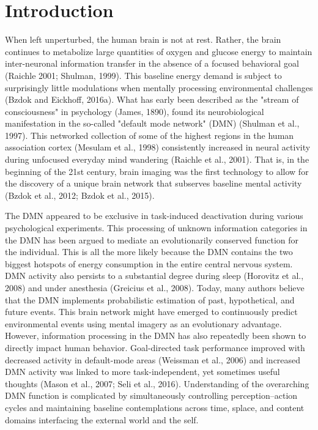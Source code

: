 \documentclass{article} %
\begin{document}
\section{Introduction}
%
When left unperturbed, the human brain is not at rest.
Rather, the brain continues to metabolize large quantities of
oxygen and glucose energy to maintain inter-neuronal information
transfer in the absence of a focused behavioral goal (Raichle 2001;
Shulman, 1999).
This baseline energy demand is subject to surprisingly little modulations
when mentally processing environmental challenges
(Bzdok and Eickhoff, 2016a).
What has early been described as the "stream of consciousness"
in psychology (James, 1890), found its neurobiological manifestation 
in the so-called "default mode network" (DMN)
(Shulman et al., 1997). This networked collection of some of the highest regions in
the human association cortex (Mesulam et al., 1998) consistently
increased in neural activity during
unfocused everyday mind wandering (Raichle et al., 2001). That is, in
the beginning of the 21st century, brain imaging was the first technology
to allow for the discovery of a unique brain network that subserves
baseline mental activity (Bzdok et al., 2012; Bzdok et al., 2015).



The DMN appeared to be exclusive in task-induced
deactivation during various psychological experiments.
This processing of unknown information categories in the DMN has
been argued to mediate an evolutionarily conserved function for the individual.
This is all the more likely because the DMN contains the two
biggest hotspots of energy consumption in the entire central nervous system.
DMN activity also persists to a substantial degree during
sleep (Horovitz et al., 2008) and under anesthesia (Greicius et al., 2008).
Today, many authors believe that the DMN implements
probabilistic estimation of past, hypothetical, and future events. This
brain network
might have emerged to continuously predict environmental events using
mental imagery as an evolutionary advantage.
%
However, information processing in the DMN has also repeatedly
been shown to directly impact human behavior. Goal-directed task performance
improved with decreased activity in default-mode areas (Weissman et al., 2006)
and increased DMN activity was linked to more task-independent,
yet sometimes useful thoughts (Mason et al., 2007; Seli et al., 2016). 
%
Understanding of the overarching DMN function is complicated by
simultaneously controlling perception–action cycles and
maintaining baseline contemplations
across time, splace, and content domains
interfacing the external world and the self.
\end{document}
